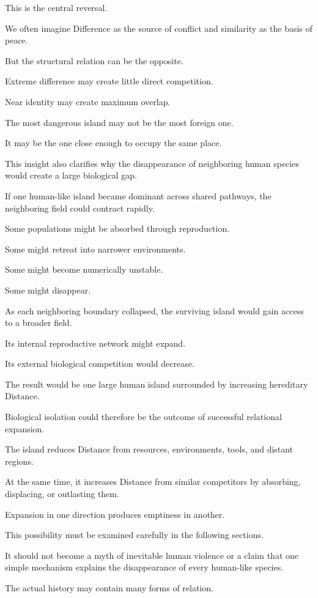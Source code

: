 This is the central reversal.

We often imagine Difference as the source of conflict and similarity as the basis of peace.

But the structural relation can be the opposite.

Extreme difference may create little direct competition.

Near identity may create maximum overlap.

The most dangerous island may not be the most foreign one.

It may be the one close enough to occupy the same place.

This insight also clarifies why the disappearance of neighboring human species would create a large biological gap.

If one human-like island became dominant across shared pathways, the neighboring field could contract rapidly.

Some populations might be absorbed through reproduction.

Some might retreat into narrower environments.

Some might become numerically unstable.

Some might disappear.

As each neighboring boundary collapsed, the surviving island would gain access to a broader field.

Its internal reproductive network might expand.

Its external biological competition would decrease.

The result would be one large human island surrounded by increasing hereditary Distance.

Biological isolation could therefore be the outcome of successful relational expansion.

The island reduces Distance from resources, environments, tools, and distant regions.

At the same time, it increases Distance from similar competitors by absorbing, displacing, or outlasting them.

Expansion in one direction produces emptiness in another.

This possibility must be examined carefully in the following sections.

It should not become a myth of inevitable human violence or a claim that one simple mechanism explains the disappearance of every human-like species.

The actual history may contain many forms of relation.

